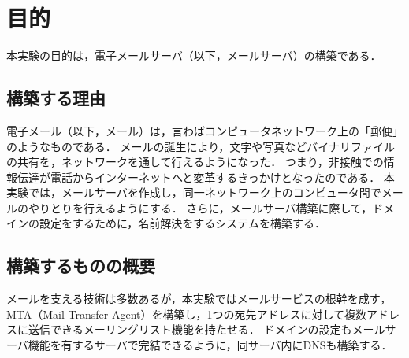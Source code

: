 \section{目的}
本実験の目的は，電子メールサーバ（以下，メールサーバ）の構築である．
\subsection{構築する理由}
電子メール（以下，メール）は，言わばコンピュータネットワーク上の「郵便」のようなものである．
メールの誕生により，文字や写真などバイナリファイルの共有を，ネットワークを通して行えるようになった．
つまり，非接触での情報伝達が電話からインターネットへと変革するきっかけとなったのである．
本実験では，メールサーバを作成し，同一ネットワーク上のコンピュータ間でメールのやりとりを行えるようにする．
さらに，メールサーバ構築に際して，ドメインの設定をするために，名前解決をするシステムを構築する．
\subsection{構築するものの概要}
メールを支える技術は多数あるが，本実験ではメールサービスの根幹を成す，MTA（Mail Transfer Agent）を構築し，1つの宛先アドレスに対して複数アドレスに送信できるメーリングリスト機能を持たせる．
ドメインの設定もメールサーバ機能を有するサーバで完結できるように，同サーバ内にDNSも構築する．
